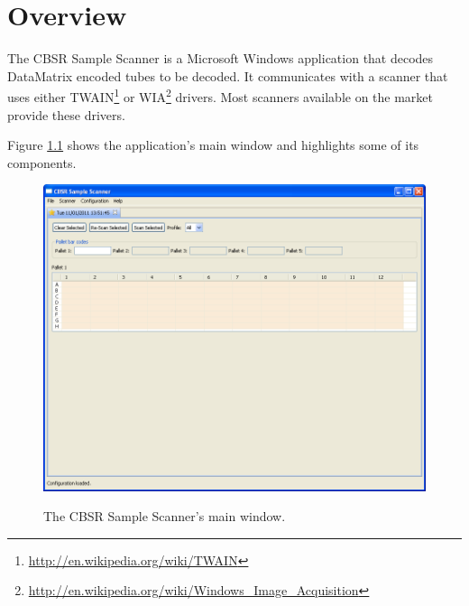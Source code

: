 \chapter{Overview}
The CBSR Sample Scanner is a Microsoft Windows application that decodes
DataMatrix encoded tubes to be decoded. It communicates with a scanner that
uses either TWAIN\footnote{\url{http://en.wikipedia.org/wiki/TWAIN}} or
WIA\footnote{\url{http://en.wikipedia.org/wiki/Windows_Image_Acquisition}}
drivers. Most scanners available on the market provide these
drivers.

Figure \ref{fig:main_window} shows the application's main window and highlights
some of its components.
\begin{figure}[H]
  \centering
  \scalebox{0.4}
	   { \includegraphics*{screenshots/overview/main_window} }
	   \caption{The CBSR Sample Scanner's main window.}
	   \label{fig:main_window}
\end{figure}
